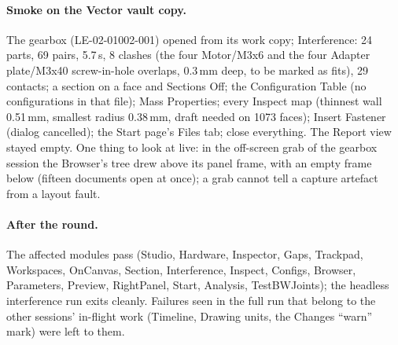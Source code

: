\paragraph{Smoke on the Vector vault copy.} The gearbox (LE-02-01002-001) opened from its work copy; Interference:
24 parts, 69 pairs, 5.7\,s, 8 clashes (the four Motor/M3x6 and the four Adapter plate/M3x40 screw-in-hole
overlaps, 0.3\,mm deep, to be marked as fits), 29 contacts; a section on a face and Sections Off; the
Configuration Table (no configurations in that file); Mass Properties; every Inspect map (thinnest wall
0.51\,mm, smallest radius 0.38\,mm, draft needed on 1073 faces); Insert Fastener (dialog cancelled); the Start
page's Files tab; close everything. The Report view stayed empty. One thing to look at live: in the off-screen
grab of the gearbox session the Browser's tree drew above its panel frame, with an empty frame below (fifteen
documents open at once); a grab cannot tell a capture artefact from a layout fault.

\paragraph{After the round.} The affected modules pass (Studio, Hardware, Inspector, Gaps, Trackpad, Workspaces,
OnCanvas, Section, Interference, Inspect, Configs, Browser, Parameters, Preview, RightPanel, Start, Analysis,
TestBWJoints); the headless interference run exits cleanly. Failures seen in the full run that belong to the
other sessions' in-flight work (Timeline, Drawing units, the Changes ``warn'' mark) were left to them.
